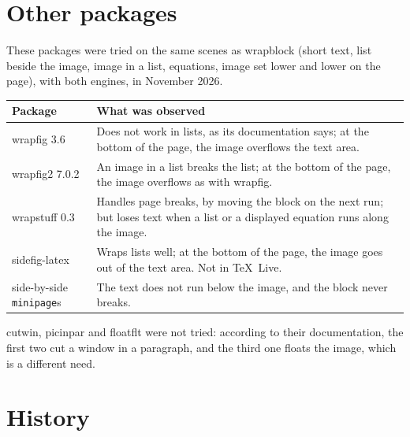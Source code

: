 \documentclass[a4paper,11pt]{article}
\newcommand\pkg[1]{\textsf{#1}}
\providecommand\env[1]{\texttt{#1}}
\begin{document}
\section{Other packages}\label{sec:others}

These packages were tried on the same scenes as \pkg{wrapblock} (short text, list beside the image, image in a list, equations, image set lower and lower on the page), with both engines, in November 2026.

\begin{center}
\begin{tabularx}{\linewidth}{@{}lX@{}}
\toprule
Package & What was observed \\
\midrule
\pkg{wrapfig} 3.6 & Does not work in lists, as its documentation says; at the bottom of the page, the image overflows the text area. \\
\pkg{wrapfig2} 7.0.2 & An image in a list breaks the list; at the bottom of the page, the image overflows as with \pkg{wrapfig}. \\
\pkg{wrapstuff} 0.3 & Handles page breaks, by moving the block on the next run; but loses text when a list or a displayed equation runs along the image. \\
\pkg{sidefig-latex} & Wraps lists well; at the bottom of the page, the image goes out of the text area. Not in TeX~Live. \\
side-by-side \env{minipage}s & The text does not run below the image, and the block never breaks. \\
\bottomrule
\end{tabularx}
\end{center}

\pkg{cutwin}, \pkg{picinpar} and \pkg{floatflt} were not tried: according to their documentation, the first two cut a window in a paragraph, and the third one floats the image, which is a different need.

\section{History}
\end{document}
